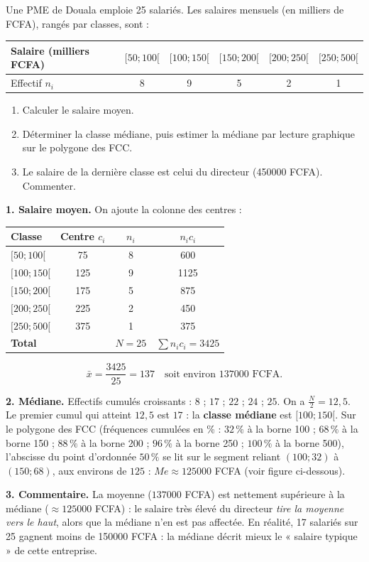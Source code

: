 \documentclass[11pt]{article}
\begin{document}
\begin{exoresolu}
Une PME de Douala emploie 25 salariés. Les salaires mensuels (en milliers de FCFA), rangés par classes, sont :
\begin{center}
\begin{tabular}{|l|c|c|c|c|c|}
\hline
\rowcolor{popblueL} Salaire (milliers FCFA) & $[50;100[$ & $[100;150[$ & $[150;200[$ & $[200;250[$ & $[250;500[$ \\
\hline
Effectif $n_i$ & 8 & 9 & 5 & 2 & 1 \\
\hline
\end{tabular}
\end{center}
\begin{enumerate}
\item Calculer le salaire moyen.
\item Déterminer la classe médiane, puis estimer la médiane par lecture graphique sur le polygone des FCC.
\item Le salaire de la dernière classe est celui du directeur (\num{450000} FCFA). Commenter.
\end{enumerate}
\tcblower
\textbf{1. Salaire moyen.} On ajoute la colonne des centres :
\begin{center}
\begin{tabular}{|l|c|c|c|}
\hline
\rowcolor{popblueL} Classe & Centre $c_i$ & $n_i$ & $n_i c_i$ \\
\hline
$[50;100[$ & 75 & 8 & 600 \\
$[100;150[$ & 125 & 9 & \num{1125} \\
$[150;200[$ & 175 & 5 & 875 \\
$[200;250[$ & 225 & 2 & 450 \\
$[250;500[$ & 375 & 1 & 375 \\
\hline
\textbf{Total} & & $N = 25$ & $\sum n_i c_i = \num{3425}$ \\
\hline
\end{tabular}
\end{center}
\[ \bar{x} = \frac{\num{3425}}{25} = 137 \quad \text{soit environ } \num{137000} \text{ FCFA}. \]

\textbf{2. Médiane.} Effectifs cumulés croissants : $8$ ; $17$ ; $22$ ; $24$ ; $25$. On a $\frac{N}{2} = 12{,}5$. Le premier cumul qui atteint $12{,}5$ est $17$ : la \textbf{classe médiane} est $[100;150[$. Sur le polygone des FCC (fréquences cumulées en \% : $32\,\%$ à la borne 100 ; $68\,\%$ à la borne 150 ; $88\,\%$ à la borne 200 ; $96\,\%$ à la borne 250 ; $100\,\%$ à la borne 500), l'abscisse du point d'ordonnée $50\,\%$ se lit sur le segment reliant $(100;32)$ à $(150;68)$, aux environs de $125$ : $Me \approx \num{125000}$ FCFA (voir figure ci-dessous).

\textbf{3. Commentaire.} La moyenne ($\num{137000}$ FCFA) est nettement supérieure à la médiane ($\approx \num{125000}$ FCFA) : le salaire très élevé du directeur \emph{tire la moyenne vers le haut}, alors que la médiane n'en est pas affectée. En réalité, 17 salariés sur 25 gagnent moins de \num{150000} FCFA : la médiane décrit mieux le « salaire typique » de cette entreprise.
\end{exoresolu}
\end{document}
